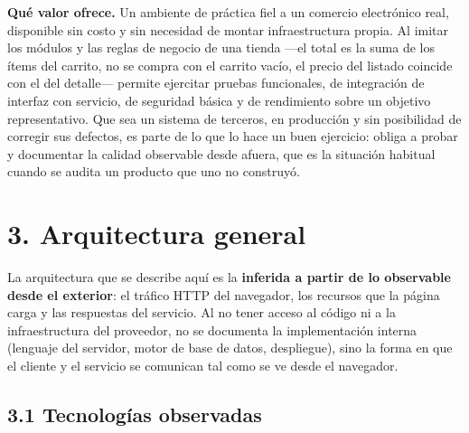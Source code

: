 \textbf{Qué valor ofrece.} Un ambiente de práctica fiel a un comercio electrónico real,
disponible sin costo y sin necesidad de montar infraestructura propia. Al imitar los
módulos y las reglas de negocio de una tienda —el total es la suma de los ítems del
carrito, no se compra con el carrito vacío, el precio del listado coincide con el del
detalle— permite ejercitar pruebas funcionales, de integración de interfaz con
servicio, de seguridad básica y de rendimiento sobre un objetivo representativo. Que
sea un sistema de terceros, en producción y sin posibilidad de corregir sus defectos,
es parte de lo que lo hace un buen ejercicio: obliga a probar y documentar la calidad
observable desde afuera, que es la situación habitual cuando se audita un producto que
uno no construyó.

\FloatBarrier
\section*{3. Arquitectura general}

La arquitectura que se describe aquí es la \textbf{inferida a partir de lo observable
desde el exterior}: el tráfico HTTP del navegador, los recursos que la página carga y
las respuestas del servicio. Al no tener acceso al código ni a la infraestructura del
proveedor, no se documenta la implementación interna (lenguaje del servidor, motor de
base de datos, despliegue), sino la forma en que el cliente y el servicio se comunican
tal como se ve desde el navegador.

\subsection*{3.1 Tecnologías observadas}

